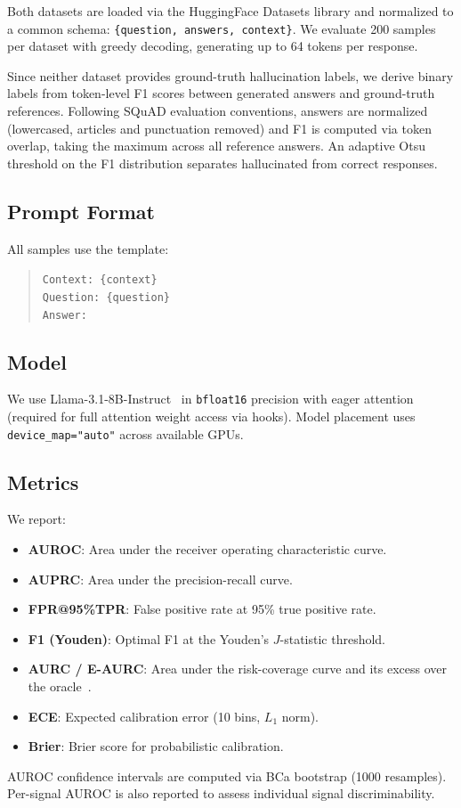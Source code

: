 \documentclass{article}
\begin{document}
Both datasets are loaded via the HuggingFace Datasets library and normalized to a common schema: \texttt{\{question, answers, context\}}. We evaluate 200 samples per dataset with greedy decoding, generating up to 64 tokens per response.

Since neither dataset provides ground-truth hallucination labels, we derive binary labels from token-level F1 scores between generated answers and ground-truth references. Following SQuAD evaluation conventions, answers are normalized (lowercased, articles and punctuation removed) and F1 is computed via token overlap, taking the maximum across all reference answers. An adaptive Otsu threshold on the F1 distribution separates hallucinated from correct responses.

\subsection{Prompt Format}

All samples use the template:
\begin{quote}
\texttt{Context: \{context\}}\\[2pt]
\texttt{Question: \{question\}}\\[2pt]
\texttt{Answer:}
\end{quote}

\subsection{Model}

We use Llama-3.1-8B-Instruct~\citep{dubey2024llama} in \texttt{bfloat16} precision with eager attention (required for full attention weight access via hooks). Model placement uses \texttt{device\_map="auto"} across available GPUs.

\subsection{Metrics}

We report:
\begin{itemize}
    \item \textbf{AUROC}: Area under the receiver operating characteristic curve.
    \item \textbf{AUPRC}: Area under the precision-recall curve.
    \item \textbf{FPR@95\%TPR}: False positive rate at 95\% true positive rate.
    \item \textbf{F1 (Youden)}: Optimal F1 at the Youden's $J$-statistic threshold.
    \item \textbf{AURC / E-AURC}: Area under the risk-coverage curve and its excess over the oracle~\citep{geifman2017selective}.
    \item \textbf{ECE}: Expected calibration error (10 bins, $L_1$ norm).
    \item \textbf{Brier}: Brier score for probabilistic calibration.
\end{itemize}
AUROC confidence intervals are computed via BCa bootstrap (1000 resamples). Per-signal AUROC is also reported to assess individual signal discriminability.
\end{document}
